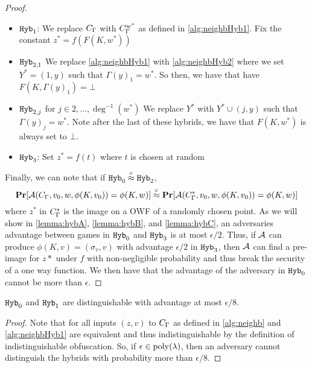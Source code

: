 \begin{lemma}
\begin{proof}
\begin{itemize}
			\item $\texttt{Hyb}_1$: We replace $C_\Gamma$ with $C_\Gamma^{w^*}$ as defined in \ref{alg:neighbHyb1}.
			Fix the constant $z^* = f(F(K, w^*))$
			\item $\texttt{Hyb}_{2, 1}$
			We replace \cref{alg:neighbHyb1} with \cref{alg:neighbHyb2} where we 
			set $Y^* = (1, y)$ such that $\Gamma(y)_1 = w^*$. So then, we have that
			have $F(K, \Gamma(y)_1) = \bot$
			\item $\texttt{Hyb}_{2, j}$ for $j \in 2, \dots, \deg^{-1}(w^*)$
			We replace $Y^*$ with $Y^* \cup (j, y)$ such that $\Gamma(y)_j = w^*$.
			Note after the last of these hybrids, we have that $F(K, w^*)$ is always set to $\bot$.
			\item $\texttt{Hyb}_3$: Set $z^* = f(t)$ where $t$ is chosen at random %
		\end{itemize}
		Finally, we can note that if $\texttt{Hyb}_0 \overset{c}{\approx} \texttt{Hyb}_2$,
		\begin{equation*}
			\operatorname*{\mathbf{Pr}}[\mathcal{A}(C_\Gamma, v_0, w, \phi(K, v_0)) = \phi(K, w)] 
			\overset{c}{\approx}
			\operatorname*{\mathbf{Pr}}[\mathcal{A}(C_\Gamma^*, v_0, w, \phi(K, v_0)) = \phi(K, w)]
		\end{equation*}
		where $z^*$ in $C_\Gamma^*$	is the image on a OWF of a randomly chosen point.
		As we will show in \cref{lemma:hybA}, \cref{lemma:hybB}, and \cref{lemma:hybC},
		an adversaries advantage between games in $\texttt{Hyb}_0$ and $\texttt{Hyb}_3$ is at most $\epsilon / 2$.
		Thus, if $\mathcal{A}$ can produce $\phi(K, v) = (\sigma_v, v)$ with advantage $\epsilon / 2$
		in $\texttt{Hyb}_3$, then $\mathcal{A}$
		can find a pre-image for $z*$ under $f$ with non-negligible probability and thus break the security of a one way function.
		We then have that the advantage of the adversary in $\texttt{Hyb}_0$ cannot be more than $\epsilon$.
	\end{proof}
\end{lemma}


\begin{lemma}
	\label{lemma:hybA}
	$\texttt{Hyb}_0$ and $\texttt{Hyb}_1$ are distinguishable with advantage at most $\epsilon / 8$.
	\begin{proof}
		Note that for all inputs $(z, v)$ to $C_\Gamma$ as defined in \cref{alg:neighb} and \cref{alg:neighbHyb1}
		are equivalent and thus indistinguishable by the definition of indistinguishable obfuscation.
		So, if $\epsilon \in \operatorname{poly}(\lambda)$, then an adversary cannot distinguish the hybrids with probability more than $\epsilon / 8$.
	\end{proof}
\end{lemma}

